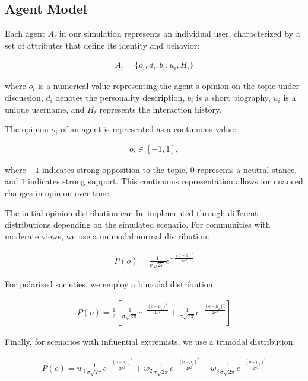 \subsection{Agent Model}
\label{subsec:agent-model}

Each agent $A_i$ in our simulation represents an individual user, characterized by a set of attributes that define its identity and behavior:

\begin{align}
A_i = \{o_i, d_i, b_i, u_i, H_i\}
\end{align}

where $o_i$ is a numerical value representing the agent's opinion on the topic under discussion, $d_i$ denotes the personality description, $b_i$ is a short biography, $u_i$ is a unique username, and $H_i$ represents the interaction history.



The opinion $o_i$ of an agent is represented as a continuous value:

\begin{align}
o_i \in [-1, 1],
\end{align}

where $-1$ indicates strong opposition to the topic, $0$ represents a neutral stance, and $1$ indicates strong support. This continuous representation allows for nuanced changes in opinion over time. 

The initial opinion distribution can be implemented through different distributions depending on the simulated scenario. For communities with moderate views, we use a unimodal normal distribution:

\begin{align}
P(o) = \frac{1}{\sigma\sqrt{2\pi}} e^{-\frac{(o-\mu)^2}{2\sigma^2}}
\end{align}

For polarized societies, we employ a bimodal distribution:

\begin{align}
P(o) = \frac{1}{2}\left[\frac{1}{\sigma\sqrt{2\pi}} e^{-\frac{(o-\mu_1)^2}{2\sigma^2}} + \frac{1}{\sigma\sqrt{2\pi}} e^{-\frac{(o-\mu_2)^2}{2\sigma^2}}\right]
\end{align}

Finally, for scenarios with influential extremists, we use a trimodal distribution:

\begin{align}
P(o) = w_1\frac{1}{\sigma\sqrt{2\pi}} e^{-\frac{(o-\mu_1)^2}{2\sigma^2}} + w_2\frac{1}{\sigma\sqrt{2\pi}} e^{-\frac{(o-\mu_2)^2}{2\sigma^2}} + w_3\frac{1}{\sigma\sqrt{2\pi}} e^{-\frac{(o-\mu_3)^2}{2\sigma^2}}
\end{align}

